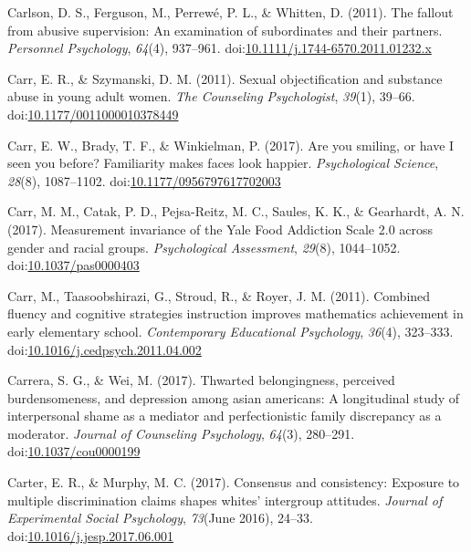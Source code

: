 \documentclass[english,man]{apa6}
\begin{document}
\hypertarget{ref-Carlson2011}{}
Carlson, D. S., Ferguson, M., Perrewé, P. L., \& Whitten, D. (2011). The
fallout from abusive supervision: An examination of subordinates and
their partners. \emph{Personnel Psychology}, \emph{64}(4), 937--961.
doi:\href{https://doi.org/10.1111/j.1744-6570.2011.01232.x}{10.1111/j.1744-6570.2011.01232.x}

\hypertarget{ref-Carr2011a}{}
Carr, E. R., \& Szymanski, D. M. (2011). Sexual objectification and
substance abuse in young adult women. \emph{The Counseling
Psychologist}, \emph{39}(1), 39--66.
doi:\href{https://doi.org/10.1177/0011000010378449}{10.1177/0011000010378449}

\hypertarget{ref-Carr2017}{}
Carr, E. W., Brady, T. F., \& Winkielman, P. (2017). Are you smiling, or
have I seen you before? Familiarity makes faces look happier.
\emph{Psychological Science}, \emph{28}(8), 1087--1102.
doi:\href{https://doi.org/10.1177/0956797617702003}{10.1177/0956797617702003}

\hypertarget{ref-Carr2016}{}
Carr, M. M., Catak, P. D., Pejsa-Reitz, M. C., Saules, K. K., \&
Gearhardt, A. N. (2017). Measurement invariance of the Yale Food
Addiction Scale 2.0 across gender and racial groups. \emph{Psychological
Assessment}, \emph{29}(8), 1044--1052.
doi:\href{https://doi.org/10.1037/pas0000403}{10.1037/pas0000403}

\hypertarget{ref-Carr2011}{}
Carr, M., Taasoobshirazi, G., Stroud, R., \& Royer, J. M. (2011).
Combined fluency and cognitive strategies instruction improves
mathematics achievement in early elementary school. \emph{Contemporary
Educational Psychology}, \emph{36}(4), 323--333.
doi:\href{https://doi.org/10.1016/j.cedpsych.2011.04.002}{10.1016/j.cedpsych.2011.04.002}

\hypertarget{ref-Carrera2017}{}
Carrera, S. G., \& Wei, M. (2017). Thwarted belongingness, perceived
burdensomeness, and depression among asian americans: A longitudinal
study of interpersonal shame as a mediator and perfectionistic family
discrepancy as a moderator. \emph{Journal of Counseling Psychology},
\emph{64}(3), 280--291.
doi:\href{https://doi.org/10.1037/cou0000199}{10.1037/cou0000199}

\hypertarget{ref-Carter2017}{}
Carter, E. R., \& Murphy, M. C. (2017). Consensus and consistency:
Exposure to multiple discrimination claims shapes whites' intergroup
attitudes. \emph{Journal of Experimental Social Psychology},
\emph{73}(June 2016), 24--33.
doi:\href{https://doi.org/10.1016/j.jesp.2017.06.001}{10.1016/j.jesp.2017.06.001}
\end{document}
